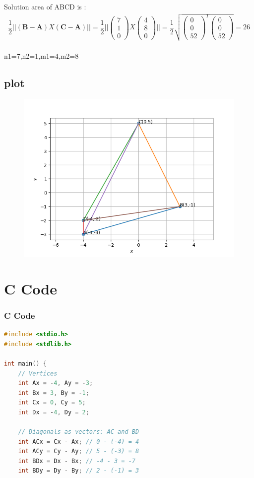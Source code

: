 \documentclass{beamer}
\let\vec\mathbf
\theoremstyle{remark}
\newcommand{\myvec}[1]{\ensuremath{\begin{pmatrix}#1\end{pmatrix}}}
\numberwithin{equation}{section}
\begin{document}
\begin{frame}{Solution}
{area of ABCD is :}
\begin{align*}
     \dfrac{1}{2}||(\vec{B}-  \vec{A})X(\vec{C} -  \vec{A})||=\dfrac{1}{2}||\myvec{7\\1\\0}X\myvec{4\\8\\0}||= \dfrac{1}{2}\sqrt{\myvec{0\\0\\52}^T\myvec{0\\0\\52}}=26
    \end{align*}
    \\
    n1=7,n2=1,m1=4,m2=8

\end{frame}
    \subsection{plot}
       \begin{frame}[fragile]
    \begin{figure}[H]
    \centering
    \includegraphics[width = 0.6\columnwidth]{../figs/img.png}
    \caption*{}
    \label{figs}
\end{figure}
\end{frame}
\section{ C Code}
\begin{frame}[fragile]
\frametitle{C Code }
\begin{lstlisting}[language=C]
#include <stdio.h>
#include <stdlib.h>

int main() {
    // Vertices
    int Ax = -4, Ay = -3;
    int Bx = 3, By = -1;
    int Cx = 0, Cy = 5;
    int Dx = -4, Dy = 2;

    // Diagonals as vectors: AC and BD
    int ACx = Cx - Ax; // 0 - (-4) = 4
    int ACy = Cy - Ay; // 5 - (-3) = 8
    int BDx = Dx - Bx; // -4 - 3 = -7
    int BDy = Dy - By; // 2 - (-1) = 3

    
\end{lstlisting}
\end{frame}
\end{document}
